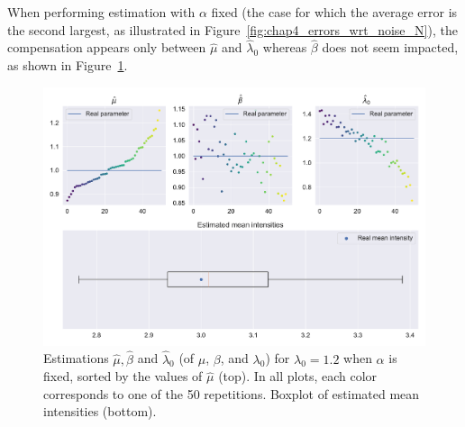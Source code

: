     When performing estimation with $\alpha$ fixed (the case for which the average error is the second largest, as illustrated in Figure~\ref{fig:chap4_errors_wrt_noise_N}), the compensation appears only between $\hat \mu$ and $\hat \lambda_0$ whereas $\hat \beta$ does not seem impacted, as shown in Figure~\ref{fig:chap4_uni_compensation_alpha_N}.

        \begin{figure}[!ht]
        \centering
        \includegraphics[width=\textwidth]{images/chapter4//compensation_alpha_N.pdf}
        \caption{Estimations $\hat \mu, \hat \beta$ and $\hat \lambda_0$ (of $\mu$, $\beta$, and $\lambda_0$) for
        $\lambda_0 = 1.2$ when $\alpha$ is fixed,
        sorted by the values of $\hat{\mu}$ (top).
        In all plots, each color corresponds to one of the 50 repetitions. Boxplot of estimated mean intensities (bottom).}
        \label{fig:chap4_uni_compensation_alpha_N}
        \end{figure}


     
        
